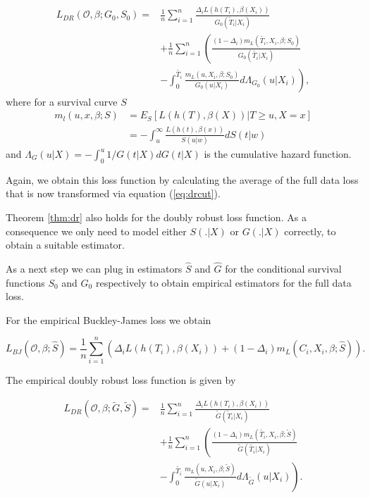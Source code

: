 \documentclass[12pt, a4paper]{article}
\theoremstyle{definition}
\theoremstyle{plain}
\numberwithin{equation}{section}
\numberwithin{figure}{section}
\numberwithin{table}{section}
\begin{document}
	\begin{equation}\label{eq:dr}
	\begin{split}
		L_{DR}(\mathcal{O}, \beta; G_0, S_0) = & \frac{1}{n} \sum_{i=1}^n \frac{\Delta_i L(h(T_i),\beta(X_i))}{G_0(\tilde{T}_i\vert X_i)}\\
		~ & + \frac{1}{n} \sum_{i=1}^n \left(\frac{(1-\Delta_i)m_L(\tilde{T_i}, X_i, \beta; S_0)}{G_0(\tilde{T_i}\vert X_i)} \right.\\
		& - \left. \int _0^{\tilde{T_i}} \frac{m_L(u, X_i, \beta; S_0)}{G_0(u \vert X_i)} d \Lambda_{G_0}(u \vert X_i) \right),
	\end{split}
	\end{equation}
	where for a survival curve $S$
	\begin{equation}\label{eq:exploss}
	\begin{split}
		m_l(u,x,\beta; S) &= E_S[L(h(T), \beta(X)) \vert T \geq u, X = x]\\
		&= - \int_u^{\infty} \frac{L(h(t), \beta(x))}{S(u \vert w)} dS(t\vert w)
	\end{split}
	\end{equation}
	and $\Lambda_G(u\vert X) = - \int_0^u  1/ G(t\vert X)dG(t \vert X)$ is the cumulative hazard function.
	
	Again, we obtain this loss function by calculating the average of the full data loss that is now transformed via equation (\ref{eq:drcut}).
	
	Theorem \ref{thm:dr} also holds for the doubly robust loss function.
	As a consequence we only need to model either $S(.\vert X)$ or $G(.\vert X)$ correctly, to obtain a suitable estimator.
	
	As a next step we can plug in estimators $\hat{S}$ and $\hat{G}$ for the conditional survival functions $S_0$ and $G_0$ respectively to obtain empirical estimators for the full data loss.
	
	For the empirical Buckley-James loss we obtain
	
	\begin{equation*}
	L_{BJ}(\mathcal{O}, \beta; \hat{S}) = \frac{1}{n} \sum_{i=1}^n \left( \Delta_i L(h(T_i), \beta(X_i))+(1-\Delta_i)m_L(C_i, X_i, \beta; \hat{S})\right).
	\end{equation*}
	
	The empirical doubly robust loss function is given by
	
	\begin{equation*}
	\begin{split}
	L_{DR}(\mathcal{O}, \beta; \tilde{G}, \tilde{S}) = & \frac{1}{n} \sum_{i=1}^n \frac{\Delta_i L(h(T_i),\beta(X_i))}{\tilde{G}(\tilde{T}_i\vert X_i)}\\
	~ & + \frac{1}{n} \sum_{i=1}^n \left(\frac{(1-\Delta_i)m_L(\tilde{T_i}, X_i, \beta; \tilde{S})}{\tilde{G}(\tilde{T_i}\vert X_i)} \right.\\
	& - \left. \int _0^{\tilde{T_i}} \frac{m_L(u, X_i, \beta; \tilde{S})}{\tilde{G}(u \vert X_i)} d \Lambda_{\tilde{G}}(u \vert X_i) \right).
	\end{split}
	\end{equation*}
	
\end{document}
